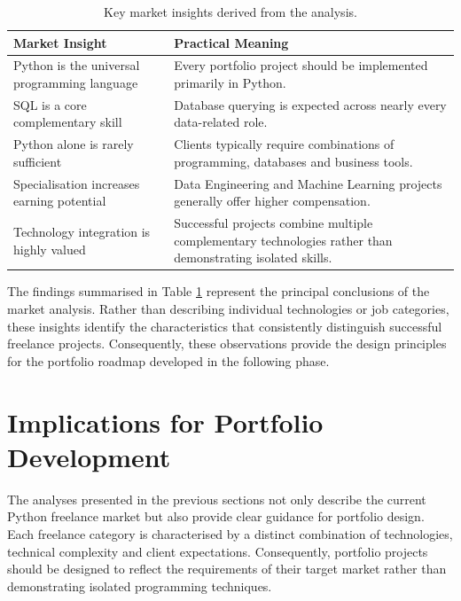 \begin{table}[H]
\centering
\small
\caption{Key market insights derived from the analysis.}
\label{tab:key_market_insights}

\begin{tabularx}{\textwidth}{l X}
\toprule
\textbf{Market Insight} & \textbf{Practical Meaning} \\
\midrule

Python is the universal programming language &
Every portfolio project should be implemented primarily in Python. \\

SQL is a core complementary skill &
Database querying is expected across nearly every data-related role. \\

Python alone is rarely sufficient &
Clients typically require combinations of programming, databases and business tools. \\

Specialisation increases earning potential &
Data Engineering and Machine Learning projects generally offer higher compensation. \\

Technology integration is highly valued &
Successful projects combine multiple complementary technologies rather than demonstrating isolated skills. \\

\bottomrule
\end{tabularx}
\end{table}

The findings summarised in Table \ref{tab:key_market_insights} represent the principal conclusions of the market analysis. Rather than describing individual
technologies or job categories, these insights identify the characteristics that consistently distinguish successful freelance projects. Consequently,
these observations provide the design principles for the portfolio roadmap developed in the following phase.

\section{Implications for Portfolio Development}

The analyses presented in the previous sections not only describe the current Python freelance market but also provide clear guidance for
portfolio design. Each freelance category is characterised by a distinct combination of technologies, technical complexity and client expectations.
Consequently, portfolio projects should be designed to reflect the requirements of their target market rather than demonstrating isolated
programming techniques.


